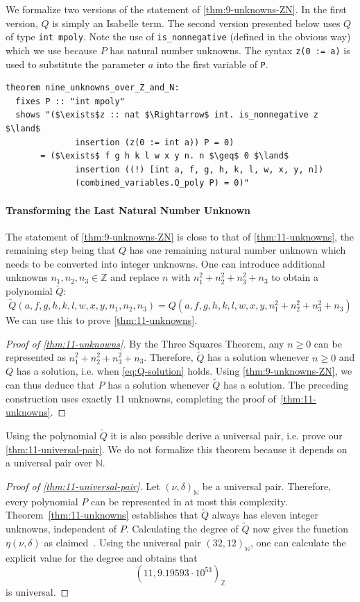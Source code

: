 \documentclass[a4paper,USenglish,cleveref,autoref,thm-restate]{lipics-v2021}
\newcommand{\N}{{\mathbb N}}
\newcommand{\Z}{{\mathbb Z}}
\begin{document}
We formalize two versions of the statement of \cref{thm:9-unknowns-ZN}. In the first version, $Q$ is simply an Isabelle term. The second version presented below uses $Q$ of type \texttt{int mpoly}. Note the use of \texttt{is\_nonnegative} (defined in the obvious way) which we use because $P$ has natural number unknowns. The syntax \lstinline{z(0 := a)} is used to substitute the parameter $a$ into the first variable of \texttt{P}. 
\begin{lstlisting}
theorem nine_unknowns_over_Z_and_N: 
  fixes P :: "int mpoly"
  shows "($\exists$z :: nat $\Rightarrow$ int. is_nonnegative z $\land$ 
              insertion (z(0 := int a)) P = 0) 
       = ($\exists$ f g h k l w x y n. n $\geq$ 0 $\land$
              insertion ((!) [int a, f, g, h, k, l, w, x, y, n])
              (combined_variables.Q_poly P) = 0)"
\end{lstlisting}

\paragraph*{Transforming the Last Natural Number Unknown}
The statement of \cref{thm:9-unknowns-ZN} is close to that of \cref{thm:11-unknowns}, the remaining step being that $Q$ has one remaining natural number unknown which needs to be converted into integer unknowns. One can introduce additional unknowns $n_1, n_2, n_3 \in \Z$ and replace $n$ with $n_1^2 + n_2^2 + n_3^2 + n_3$ to obtain a polynomial $\tilde Q$:
\[ \tilde Q (a, f, g, h, k, l, w, x, y, n_1, n_2, n_3) = Q(a, f, g, h, k, l, w, x, y, n_1^2 + n_2^2 + n_3^2 + n_3) \]
We can use this to prove \cref{thm:11-unknowns}.
\begin{proof}[Proof of \cref{thm:11-unknowns}]
    By the Three Squares Theorem, any $n \geq 0$ can be represented as $n_1^2 + n_2^2 + n_3^2 + n_3$. Therefore, $\tilde Q$ has a solution whenever $n \geq 0$ and $Q$ has a solution, i.e. when \eqref{eq:Q-solution} holds. Using \cref{thm:9-unknowns-ZN}, we can thus deduce that $P$ has a solution whenever $\tilde Q$ has a solution. The preceding construction uses exactly 11 unknowns, completing the proof of~\cref{thm:11-unknowns}.
\end{proof}

Using the polynomial $\tilde Q$ it is also possible derive a universal pair, i.e. prove our \cref{thm:11-universal-pair}. We do not formalize this theorem because it depends on a universal pair over $\N$.
\begin{proof}[Proof of \cref{thm:11-universal-pair}]
    Let $(\nu, \delta)_\N$ be a universal pair. Therefore, every polynomial $P$ can be represented in at most this complexity. Theorem~\ref{thm:11-unknowns} establishes that $\tilde Q$ always has eleven integer unknowns, independent of $P$. Calculating the degree of $\tilde Q$ now gives the function $\eta(\nu, \delta)$ as claimed~\cite[Appendix A]{manuscript}. Using the universal pair $(32, 12)_\N$, one can calculate the explicit value for the degree and obtains that 
    \[ (11, 9.19593 \cdot 10^{53})_\Z \]
    is universal. 
\end{proof}
\end{document}
